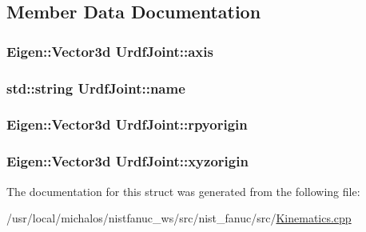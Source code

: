 \subsection{Member Data Documentation}
\hypertarget{structUrdfJoint_a900e3bc74dd9984af068a6de07a583fc}{
\subsubsection[{axis}]{\setlength{\rightskip}{0pt plus 5cm}Eigen\-::\-Vector3d Urdf\-Joint\-::axis}}\label{structUrdfJoint_a900e3bc74dd9984af068a6de07a583fc}
\hypertarget{structUrdfJoint_aeb40eb7f0702d308f51b573ff3446b67}{
\subsubsection[{name}]{\setlength{\rightskip}{0pt plus 5cm}std\-::string Urdf\-Joint\-::name}}\label{structUrdfJoint_aeb40eb7f0702d308f51b573ff3446b67}
\hypertarget{structUrdfJoint_a848ca8e8d7b630e701addaabc24ddbac}{
\subsubsection[{rpyorigin}]{\setlength{\rightskip}{0pt plus 5cm}Eigen\-::\-Vector3d Urdf\-Joint\-::rpyorigin}}\label{structUrdfJoint_a848ca8e8d7b630e701addaabc24ddbac}
\hypertarget{structUrdfJoint_a7fb7c9ceb16a4e2e1b6901ac1d8434a1}{
\subsubsection[{xyzorigin}]{\setlength{\rightskip}{0pt plus 5cm}Eigen\-::\-Vector3d Urdf\-Joint\-::xyzorigin}}\label{structUrdfJoint_a7fb7c9ceb16a4e2e1b6901ac1d8434a1}


The documentation for this struct was generated from the following file\-:\begin{DoxyCompactItemize}
\item 
/usr/local/michalos/nistfanuc\-\_\-ws/src/nist\-\_\-fanuc/src/\hyperlink{src_2Kinematics_8cpp}{Kinematics.\-cpp}\end{DoxyCompactItemize}
